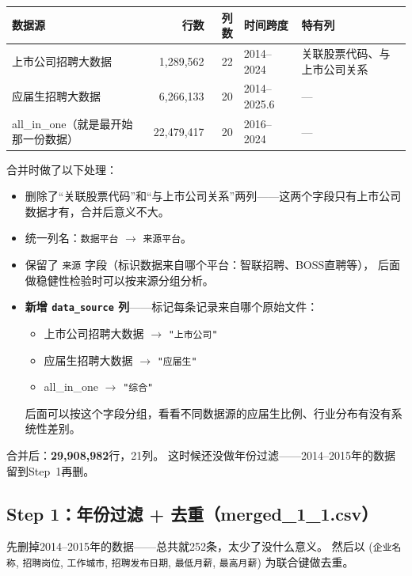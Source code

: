 \documentclass[12pt,a4paper]{ctexart}
\begin{document}
\begin{table}[h]
\centering
\small
\begin{tabular}{lrrll}
\toprule
\textbf{数据源} & \textbf{行数} & \textbf{列数} & \textbf{时间跨度} & \textbf{特有列} \\
\midrule
上市公司招聘大数据 & 1,289,562 & 22 & 2014--2024 & 关联股票代码、与上市公司关系 \\
应届生招聘大数据 & 6,266,133 & 20 & 2014--2025.6 & --- \\
all\_in\_one（就是最开始那一份数据） & 22,479,417 & 20 & 2016--2024 & --- \\
\bottomrule
\end{tabular}
\end{table}

合并时做了以下处理：
\begin{itemize}
\item 删除了``关联股票代码''和``与上市公司关系''两列——这两个字段只有上市公司数据才有，合并后意义不大。
\item 统一列名：\texttt{数据平台} $\to$ \texttt{来源平台}。
\item 保留了 \texttt{来源} 字段（标识数据来自哪个平台：智联招聘、BOSS直聘等），
后面做稳健性检验时可以按来源分组分析。
\item \textbf{新增 \texttt{data\_source} 列}——标记每条记录来自哪个原始文件：
\begin{itemize}
\item 上市公司招聘大数据 $\to$ \texttt{"上市公司"}
\item 应届生招聘大数据 $\to$ \texttt{"应届生"}
\item all\_in\_one $\to$ \texttt{"综合"}
\end{itemize}
后面可以按这个字段分组，看看不同数据源的应届生比例、行业分布有没有系统性差别。
\end{itemize}

合并后：\textbf{29,908,982}行，21列。
这时候还没做年份过滤——2014--2015年的数据留到Step~1再删。


\subsection{Step 1：年份过滤 + 去重（merged\_1\_1.csv）}

先删掉2014--2015年的数据——总共就252条，太少了没什么意义。
然后以 (\texttt{企业名称}, \texttt{招聘岗位}, \texttt{工作城市}, \texttt{招聘发布日期}, \texttt{最低月薪}, \texttt{最高月薪}) 为联合键做去重。
\end{document}
